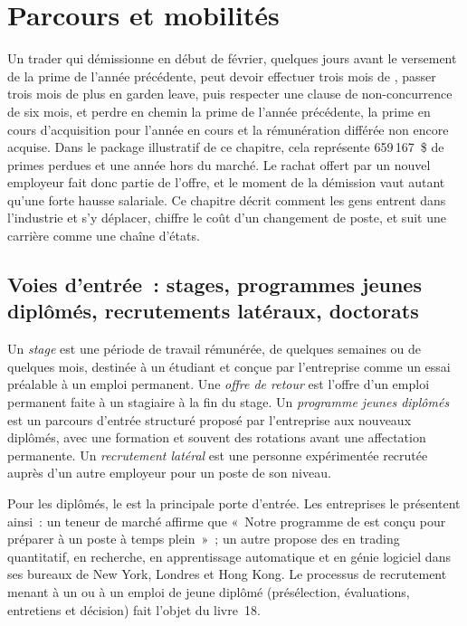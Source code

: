  \chapter{Parcours et mobilités}\label{ch:in:career-paths-and-moves}

Un trader qui démissionne en début de février, quelques jours avant le versement de la prime de l'année précédente, peut devoir effectuer trois
mois de , passer trois mois de plus en garden leave, puis respecter une clause de non-concurrence de six mois, et perdre en chemin la
prime de l'année précédente, la prime en cours d'acquisition pour l'année en cours et la rémunération différée non encore acquise. Dans le package illustratif de
ce chapitre, cela représente 659\,167~\$ de primes perdues et une année hors du marché. Le rachat offert par un nouvel employeur fait donc partie
de l'offre, et le moment de la démission vaut autant qu'une forte hausse salariale. Ce chapitre décrit comment les gens entrent dans
l'industrie et s'y déplacer, chiffre le coût d'un changement de poste, et suit une carrière comme une chaîne d'états.

\section{Voies d'entrée~: stages, programmes jeunes diplômés, recrutements latéraux, doctorats}

\begin{definition}\label{def:in:career-paths-and-moves:entry}
Un \emph{stage} est une période de travail rémunérée, de quelques semaines ou de quelques mois, destinée à un étudiant et conçue par
l'entreprise comme un essai préalable à un emploi permanent. Une \emph{offre de retour} est l'offre d'un emploi permanent faite à un
stagiaire à la fin du stage. Un \emph{programme jeunes diplômés} est un parcours d'entrée structuré
proposé par l'entreprise aux nouveaux diplômés, avec une formation et souvent des rotations avant une affectation permanente. Un \emph{recrutement latéral}
est une personne expérimentée recrutée auprès d'un autre employeur pour un poste de son niveau.
\end{definition}

Pour les diplômés, le  est la principale porte d'entrée. Les entreprises le présentent ainsi~: un teneur de marché affirme que «~Notre
programme de  est conçu pour préparer à un poste à temps plein~»~; un autre propose des  en trading quantitatif,
en recherche, en apprentissage automatique et en génie logiciel dans ses bureaux de New York, Londres et Hong Kong. Le processus
de recrutement menant à un  ou à un emploi de jeune diplômé (présélection, évaluations, entretiens et décision) fait l'objet
du livre~18.

